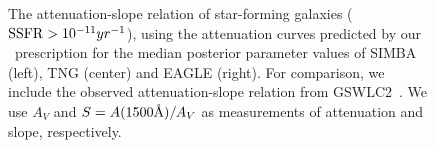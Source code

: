 \begin{figure}
\begin{center}
    \caption{\label{fig:slope}
    The attenuation-slope relation of star-forming galaxies (${\rm SSFR} >
    10^{-11}yr^{-1}$), using the attenuation curves predicted by our  
    \eda~prescription for the median posterior parameter values of SIMBA
    (left), TNG (center) and EAGLE (right). 
    For comparison, we include the observed attenuation-slope relation
    from GSWLC2~\citep{salim2020}. 
    We use $A_V$ and $S = A(1500\AA)/A_V$ as measurements of attenuation and
    slope, respectively. 
    }
\end{center}
\end{figure}

